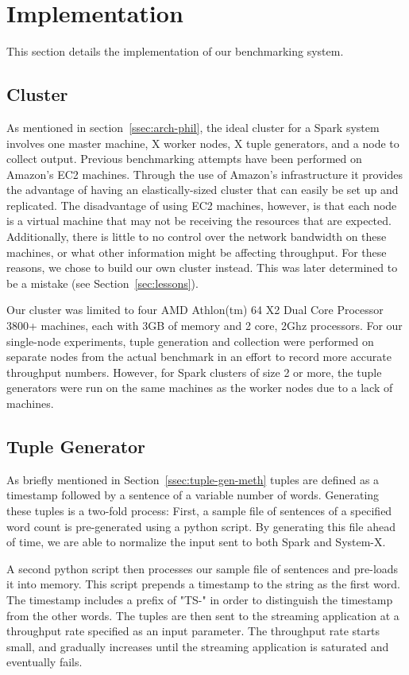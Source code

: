 \section{Implementation}
This section details the implementation of our benchmarking system.
\subsection{Cluster}
As mentioned in section~\ref{ssec:arch-phil}, the ideal cluster for a Spark system involves one master machine, X worker nodes, X tuple generators, and a node to collect output.  Previous benchmarking attempts have been performed on Amazon's EC2 machines.  Through the use of Amazon's infrastructure it provides the advantage of having an elastically-sized cluster that can easily be set up and replicated.  The disadvantage of using EC2 machines, however, is that each node is a virtual machine that may not be receiving the resources that are expected.  Additionally, there is little to no control over the network bandwidth on these machines, or what other information might be affecting throughput.  For these reasons, we chose to build our own cluster instead.  This was later determined to be a mistake (see Section~\ref{sec:lessons}).

Our cluster was limited to four AMD Athlon(tm) 64 X2 Dual Core Processor 3800+ machines, each with 3GB of memory and 2 core, 2Ghz processors.  For our single-node experiments, tuple generation and collection were performed on separate nodes from the actual benchmark in an effort to record more accurate throughput numbers.  However, for Spark clusters of size 2 or more, the tuple generators were run on the same machines as the worker nodes due to a lack of machines.

\subsection{Tuple Generator}
As briefly mentioned in Section~\ref{ssec:tuple-gen-meth} tuples are defined as a timestamp followed by a sentence of a variable number of words.  Generating these tuples is a two-fold process:  First, a sample file of sentences of a specified word count is pre-generated using a python script.  By generating this file ahead of time, we are able to normalize the input sent to both Spark and System-X.

A second python script then processes our sample file of sentences and pre-loads it into memory.  This script prepends a timestamp to the string as the first word.  The timestamp includes a prefix of "TS-" in order to distinguish the timestamp from the other words.  The tuples are then sent to the streaming application at a throughput rate specified as an input parameter.  The throughput rate starts small, and gradually increases until the streaming application is saturated and eventually fails.

